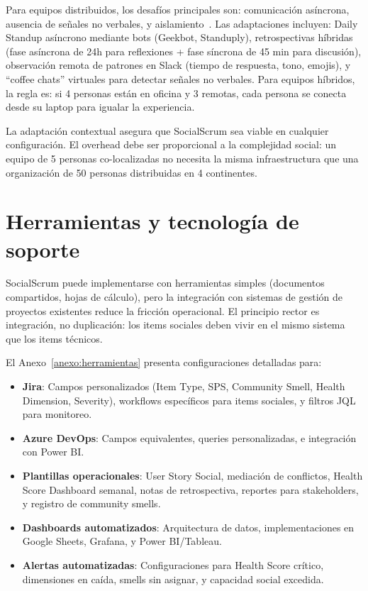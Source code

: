 Para equipos distribuidos, los desafíos principales son: comunicación asíncrona, ausencia de señales no verbales, y aislamiento~\cite{wilson2006trust, noll2020motivation}. Las adaptaciones incluyen: Daily Standup asíncrono mediante bots (Geekbot, Standuply), retrospectivas híbridas (fase asíncrona de 24h para reflexiones + fase síncrona de 45 min para discusión), observación remota de patrones en Slack (tiempo de respuesta, tono, emojis), y ``coffee chats'' virtuales para detectar señales no verbales. Para equipos híbridos, la regla es: si 4 personas están en oficina y 3 remotas, cada persona se conecta desde su laptop para igualar la experiencia.

La adaptación contextual asegura que SocialScrum sea viable en cualquier configuración. El overhead debe ser proporcional a la complejidad social: un equipo de 5 personas co-localizadas no necesita la misma infraestructura que una organización de 50 personas distribuidas en 4 continentes.

\section{Herramientas y tecnología de soporte}

SocialScrum puede implementarse con herramientas simples (documentos compartidos, hojas de cálculo), pero la integración con sistemas de gestión de proyectos existentes reduce la fricción operacional. El principio rector es integración, no duplicación: los items sociales deben vivir en el mismo sistema que los items técnicos.

El Anexo~\ref{anexo:herramientas} presenta configuraciones detalladas para:

\begin{itemize}
    \item \textbf{Jira}: Campos personalizados (Item Type, SPS, Community Smell, Health Dimension, Severity), workflows específicos para items sociales, y filtros JQL para monitoreo.
    \item \textbf{Azure DevOps}: Campos equivalentes, queries personalizadas, e integración con Power BI.
    \item \textbf{Plantillas operacionales}: User Story Social, mediación de conflictos, Health Score Dashboard semanal, notas de retrospectiva, reportes para stakeholders, y registro de community smells.
    \item \textbf{Dashboards automatizados}: Arquitectura de datos, implementaciones en Google Sheets, Grafana, y Power BI/Tableau.
    \item \textbf{Alertas automatizadas}: Configuraciones para Health Score crítico, dimensiones en caída, smells sin asignar, y capacidad social excedida.
\end{itemize}

